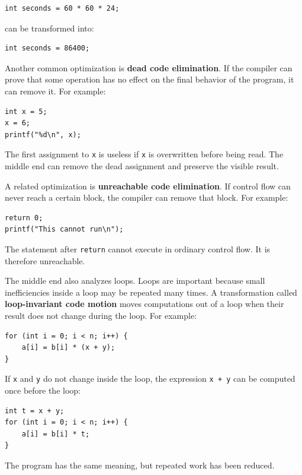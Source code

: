 \begin{verbatim}
int seconds = 60 * 60 * 24;
\end{verbatim}

can be transformed into:

\begin{verbatim}
int seconds = 86400;
\end{verbatim}

Another common optimization is \textbf{dead code elimination}. If the compiler can prove that some operation has no effect on the final behavior of the program, it can remove it. For example:

\begin{verbatim}
int x = 5;
x = 6;
printf("%d\n", x);
\end{verbatim}

The first assignment to \texttt{x} is useless if \texttt{x} is overwritten before being read. The middle end can remove the dead assignment and preserve the visible result.

A related optimization is \textbf{unreachable code elimination}. If control flow can never reach a certain block, the compiler can remove that block. For example:

\begin{verbatim}
return 0;
printf("This cannot run\n");
\end{verbatim}

The statement after \texttt{return} cannot execute in ordinary control flow. It is therefore unreachable.

The middle end also analyzes loops. Loops are important because small inefficiencies inside a loop may be repeated many times. A transformation called \textbf{loop-invariant code motion} moves computations out of a loop when their result does not change during the loop. For example:

\begin{verbatim}
for (int i = 0; i < n; i++) {
    a[i] = b[i] * (x + y);
}
\end{verbatim}

If \texttt{x} and \texttt{y} do not change inside the loop, the expression \texttt{x + y} can be computed once before the loop:

\begin{verbatim}
int t = x + y;
for (int i = 0; i < n; i++) {
    a[i] = b[i] * t;
}
\end{verbatim}

The program has the same meaning, but repeated work has been reduced.

